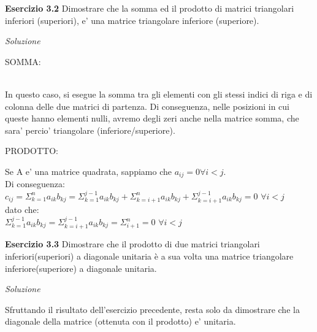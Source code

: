 \documentclass[20pt,a4paper]{book}
\begin{document}

\textbf{\Large{Esercizio 3.2}}
Dimostrare che la somma ed il prodotto di matrici triangolari inferiori (superiori),
e' una matrice triangolare inferiore (superiore).


\textit{Soluzione}\\
\begin{center}
 SOMMA:
 \end{center} \\
In questo caso, si esegue la somma tra gli elementi con gli stessi indici di riga e di colonna delle due matrici di partenza. Di conseguenza, nelle posizioni in cui queste hanno elementi nulli, avremo degli zeri anche nella matrice somma, che sara' percio' triangolare (inferiore/superiore).\\

\begin{center}
PRODOTTO: \\
\end{center}
Se A e' una matrice quadrata, sappiamo che \begin{math} a_{ij}=0 \forall i<j \end{math}.\\
Di conseguenza:\\
\begin{math} c_{ij}=\Sigma_{k=1}^{n}a_{ik}b_{kj}=\Sigma_{k=1}^{j-1}a_{ik}b_{kj}+\Sigma_{k=i+1}^{n}a_{ik}b_{kj}+\Sigma_{k=i+1}^{j-1}a_{ik}b_{kj}=0\end{math} \begin{math}  \forall  i<j \end{math}\\
dato che:\\ \begin{math} \Sigma_{k=1}^{j-1}a_{ik}b_{kj}=\Sigma_{k=i+1}^{j-1}a_{ik}b_{kj}=\Sigma_{i+1}^{n}=0\end{math} \begin{math}  \forall  i<j \end{math}

\vspace{10mm}




\textbf{\Large{Esercizio 3.3}}
Dimostrare che il prodotto di due matrici triangolari inferiori(superiori) a diagonale
unitaria è a sua volta una matrice triangolare inferiore(superiore) a diagonale unitaria.

\textit{Soluzione}

Sfruttando il risultato dell'esercizio precedente, resta solo da dimostrare che la diagonale della matrice (ottenuta con il prodotto) e' unitaria.
\end{document}
